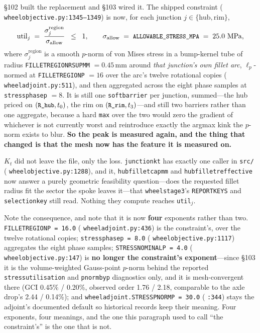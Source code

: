 \documentclass[11pt,a4paper]{article}
\DeclareRobustCommand{\code}[1]{%
  \texttt{\small\def\_{\textunderscore\discretionary{}{}{}}#1}}
\newcommand{\at}[2]{\code{#1:#2}}
\begin{document}
\S102 built the replacement and \S103 wired it. The shipped constraint
(\at{wheel\_objective.py}{1345--1349}) is now, for each junction
$j \in \{\text{hub}, \text{rim}\}$,
%
\begin{equation}
  \mathrm{util}_j \;=\;
  \frac{\sigma^{\text{region}}_j}{\sigma_{\text{allow}}} \;\;\le\;\; 1,
  \qquad
  \sigma_{\text{allow}} \;=\; \code{ALLOWABLE\_STRESS\_MPA} \;=\; 25.0\ \mathrm{MPa},
  \label{eq:stressconstraint}
\end{equation}
%
where $\sigma^{\text{region}}_j$ is a smooth $p$-norm of von Mises stress in a
bump-kernel tube of radius \code{FILLET\_REGION\_R\_SUP\_MM} $= 0.45$\,mm around
\emph{that junction's own fillet arc}, $\ell_p$-normed at \code{FILLET\_REGION\_P} $= 16$
over the arc's twelve rotational copies (\at{wheel\_adjoint.py}{511}), and then
aggregated across the eight phase samples at \code{stress\_phase\_p} $= 8$. It is still
one \code{soft\_barrier} per junction, summed---the hub priced on
$(\code{R\_hub}, t_0)$, the rim on $(\code{R\_rim}, t_3)$---and still two barriers rather
than one aggregate, because a hard \code{max} over the two would zero the gradient of
whichever is not currently worst and reintroduce exactly the argmax kink the $p$-norm
exists to blur. \textbf{So the peak is measured again, and the thing that changed is that
the mesh now has the feature it is measured on.}

$K_t$ did not leave the file, only the loss. \code{junction\_kt} has exactly one caller in
\code{src/} (\at{wheel\_objective.py}{1288}), and it, \code{hub\_fillet\_cap\_mm} and
\code{hub\_fillet\_r\_effective} now answer a purely geometric feasibility question---does
the requested fillet radius fit the sector the spoke leaves it---that
\code{wheel\_stage3}'s \code{REPORT\_KEYS} and \code{selection\_key} still read. Nothing
they compute reaches \code{util}$_j$.

Note the consequence, and note that it is now \textbf{four} exponents rather than two.
\code{FILLET\_REGION\_P = 16.0} (\at{wheel\_adjoint.py}{436}) is the constraint's, over
the twelve rotational copies; \code{stress\_phase\_p = 8.0}
(\at{wheel\_objective.py}{1117}) aggregates the eight phase samples;
\code{STRESS\_NOMINAL\_P = 4.0} (\at{wheel\_objective.py}{147}) is
\textbf{no longer the constraint's exponent}---since \S103 it is the volume-weighted
Gauss-point $p$-norm behind the reported \code{stress\_utilisation} and
\code{pnorm\_by\_p} diagnostics only, and it is mesh-convergent there (GCI 0.45\% /
0.20\%, observed order 1.76 / 2.18, comparable to the axle drop's 2.44 / 0.14\%); and
\code{wheel\_adjoint.STRESS\_PNORM\_P = 30.0} (\code{:344}) stays the adjoint's documented
default so historical records keep their meaning. Four exponents, four meanings, and the
one this paragraph used to call ``the constraint's'' is the one that is not.
\end{document}
